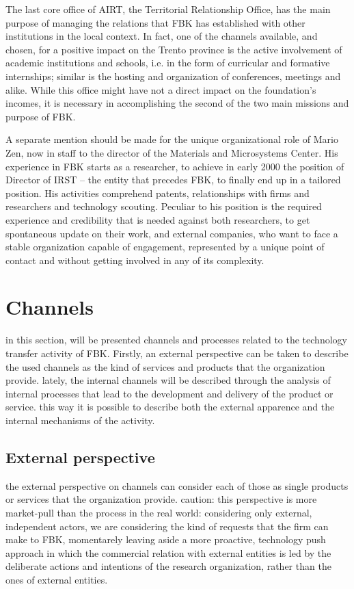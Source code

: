 The last core office of AIRT, the Territorial Relationship Office, has the main purpose of managing the relations that FBK has established with other institutions in the local context. In fact, one of the channels available, and chosen, for a positive impact on the Trento province is the active involvement of academic institutions and schools, i.e. in the form of curricular and formative internships; similar is the hosting and organization of conferences, meetings and alike. While this office might have not a direct impact on the foundation's incomes, it is necessary in accomplishing the second of the two main missions and purpose of FBK.

A separate mention should be made for the unique organizational role of Mario Zen, now in staff to the director of the Materials and Microsystems Center. His experience in FBK starts as a researcher, to achieve in early 2000 the position of Director of IRST – the entity that precedes FBK, to finally end up in a tailored position. His activities comprehend patents, relationships with firms and researchers and technology scouting. Peculiar to his position is the required experience and credibility that is needed against both researchers, to get spontaneous update on their work, and external companies, who want to face a stable organization capable of engagement, represented by a unique point of contact and without getting involved in any of its complexity.


\section{Channels}

in this section, will be presented channels and processes related to the technology transfer activity of FBK. Firstly, an external perspective can be taken to describe the used channels as the kind of services and products that the organization provide. lately, the internal channels will be described through the analysis of internal processes that lead to the development and delivery of the product or service. this way it is possible to describe both the external apparence and the internal mechanisms of the activity. 

\subsection{External perspective}

the external perspective on channels can consider each of those as single products or services that the organization provide. caution: this perspective is more market-pull than the process in the real world: considering only external, independent actors, we are considering the kind of requests that the firm can make to FBK, momentarely leaving aside a more proactive, technology push approach in which the commercial relation with external entities is led by the deliberate actions and intentions of the research organization, rather than the ones of external entities.

